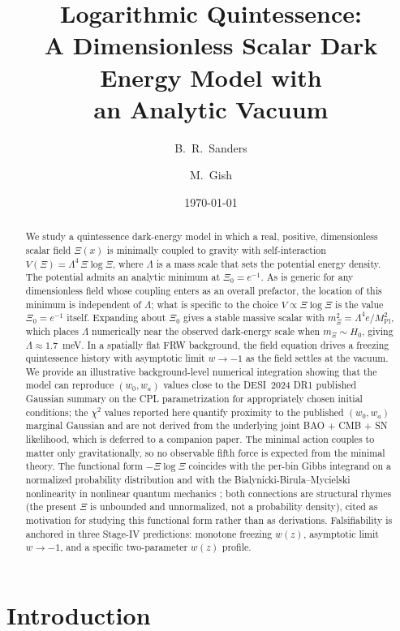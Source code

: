 \documentclass[11pt,reqno]{amsart}
\title[Logarithmic Quintessence]{Logarithmic Quintessence:\\
A Dimensionless Scalar Dark Energy Model with\\
an Analytic Vacuum}
\author{B.~R.~Sanders}
\author{M.~Gish}
\date{\today}
\theoremstyle{plain}
\theoremstyle{definition}
\theoremstyle{remark}
\newcommand{\Pl}{\mathrm{Pl}}
\begin{document}
\begin{abstract}
We study a quintessence dark-energy model in which a real, positive,
dimensionless scalar field $\Xi(x)$ is minimally coupled to gravity with
self-interaction $V(\Xi) = \Lambda^{4}\,\Xi\log\Xi$, where $\Lambda$ is a
mass scale that sets the potential energy density. The potential admits an
analytic minimum at $\Xi_0 = e^{-1}$. As is generic for any dimensionless
field whose coupling enters as an overall prefactor, the location of this
minimum is independent of $\Lambda$; what is specific to the choice
$V \propto \Xi\log\Xi$ is the value $\Xi_0 = e^{-1}$ itself. Expanding about
$\Xi_0$ gives a stable massive scalar with
$m_\Xi^{2} = \Lambda^{4} e / M_\Pl^{2}$, which places $\Lambda$ numerically
near the observed dark-energy scale when $m_\Xi \sim H_0$, giving
$\Lambda \approx 1.7$~meV. In a spatially flat FRW background, the field
equation drives a freezing quintessence history with asymptotic limit
$w \to -1$ as the field settles at the vacuum. We provide an illustrative
background-level numerical integration showing that the model can reproduce
$(w_0, w_a)$ values close to the DESI~2024 DR1 published Gaussian summary
on the CPL parametrization for appropriately chosen initial conditions;
the $\chi^{2}$ values reported here quantify proximity to the published
$(w_0, w_a)$ marginal Gaussian and are not derived from the underlying
joint BAO + CMB + SN likelihood, which is deferred to a companion paper.
The minimal action couples to matter only gravitationally, so no
observable fifth force is expected from the minimal theory. The functional
form $-\Xi\log\Xi$ coincides with the per-bin Gibbs integrand on a
normalized probability distribution and with the
Bialynicki-Birula--Mycielski nonlinearity in nonlinear quantum mechanics
\cite{BialynickiBirulaMycielski1976}; both connections are structural
rhymes (the present $\Xi$ is unbounded and unnormalized, not a probability
density), cited as motivation for studying this functional form rather
than as derivations. Falsifiability is anchored in three Stage-IV
predictions: monotone freezing $w(z)$, asymptotic limit $w \to -1$, and a
specific two-parameter $w(z)$ profile.
\end{abstract}

\maketitle

\section{Introduction}
\end{document}
